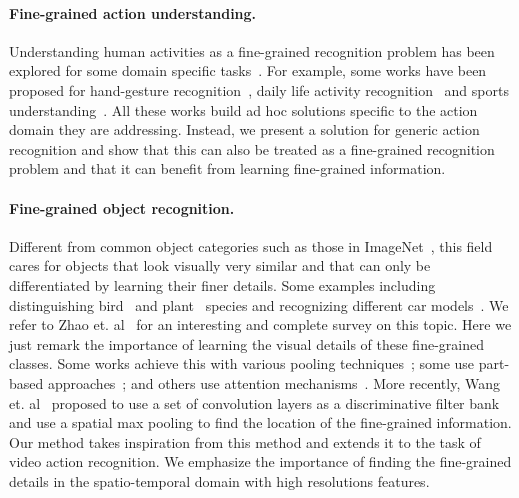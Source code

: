 \documentclass[10pt,twocolumn,letterpaper]{article}
\begin{document}
\paragraph{Fine-grained action understanding.}
Understanding human activities as a fine-grained recognition problem has been explored for some domain specific tasks~\cite{Patterson2005FGAction,Singh2016Multi}.
For example, some works have been proposed for hand-gesture recognition~\cite{Fernando2015Darwin,Lea2016Segmental,Rohrbach2016Recognizing}, daily life activity recognition~\cite{Rohrbach2012Cooking} and sports understanding~\cite{Efros2003Distance,Tsunoda2017Football,Chen2011Baseball,Assfalg2002HMM}. All these works build ad hoc solutions specific to the action domain they are addressing. Instead, we present a solution for generic action recognition and show that this can also be treated as a fine-grained recognition problem and that it can benefit from learning fine-grained information. 

\vspace{-2mm}
\paragraph{Fine-grained object recognition.} Different from common object categories such as those in ImageNet~\cite{ImageNet_CVPR09}, this field cares for objects that look visually very similar and that can only be differentiated by learning their finer details. Some examples including distinguishing bird~\cite{Welinder2010CUB} and plant~\cite{Horn2017INaturalist} species and recognizing different car models~\cite{Kraus2013Car,yang2015CompCar}.
We refer to Zhao et. al~\cite{Zhao2017FGSurvey} for an interesting and complete survey on this topic. 
Here we just remark the importance of learning the visual details of these fine-grained classes. Some works achieve this with various pooling techniques~\cite{Bilinear_TPAMI17,Factorized_Bilinear_ICCV17}; some use part-based approaches~\cite{Zhang2014PRCNN,zhang2016cvpr}; and others use attention mechanisms~\cite{Zhao2017Attention,Zheng2017MAttention}.
More recently, Wang et. al~\cite{DiscriminativeFilterBank_CVPR18} proposed to use a set of  convolution layers as a discriminative filter bank and use a spatial max pooling to find the location of the fine-grained information.
Our method takes inspiration from this method and extends it to the task of video action recognition. We emphasize the importance of finding the fine-grained details in the spatio-temporal domain with high resolutions features.
\end{document}
